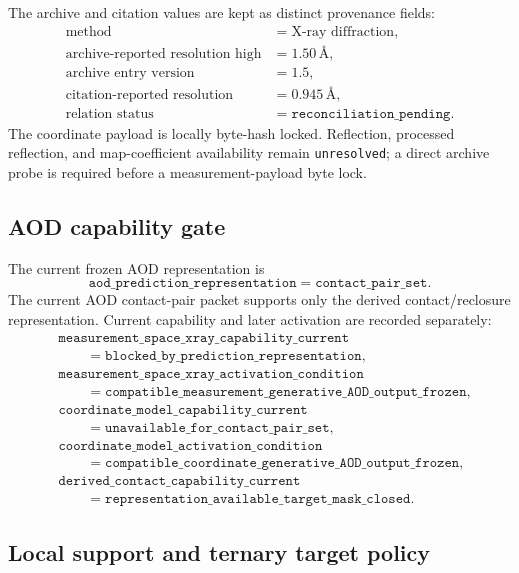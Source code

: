 The archive and citation values are kept as distinct provenance fields:
\[
\begin{aligned}
\text{method} &= \text{X-ray diffraction},\\
\text{archive-reported resolution high} &= 1.50\,\text{\AA},\\
\text{archive entry version} &= 1.5,\\
\text{citation-reported resolution} &= 0.945\,\text{\AA},\\
\text{relation status} &= \texttt{reconciliation\_pending}.
\end{aligned}
\]
The coordinate payload is locally byte-hash locked.  Reflection, processed
reflection, and map-coefficient availability remain \texttt{unresolved}; a
direct archive probe is required before a measurement-payload byte lock.

\subsection{AOD capability gate}

The current frozen AOD representation is
\[
\texttt{aod\_prediction\_representation}=\texttt{contact\_pair\_set}.
\]
The current AOD contact-pair packet supports only the derived
contact/reclosure representation. Current capability and later activation are
recorded separately:
\[
\begin{aligned}
&\texttt{measurement\_space\_xray\_capability\_current}\\
&\qquad=\texttt{blocked\_by\_prediction\_representation},\\[2pt]
&\texttt{measurement\_space\_xray\_activation\_condition}\\
&\qquad=\texttt{compatible\_measurement\_generative\_AOD\_output\_frozen},\\[2pt]
&\texttt{coordinate\_model\_capability\_current}\\
&\qquad=\texttt{unavailable\_for\_contact\_pair\_set},\\[2pt]
&\texttt{coordinate\_model\_activation\_condition}\\
&\qquad=\texttt{compatible\_coordinate\_generative\_AOD\_output\_frozen},\\[2pt]
&\texttt{derived\_contact\_capability\_current}\\
&\qquad=\texttt{representation\_available\_target\_mask\_closed}.
\end{aligned}
\]

\subsection{Local support and ternary target policy}

